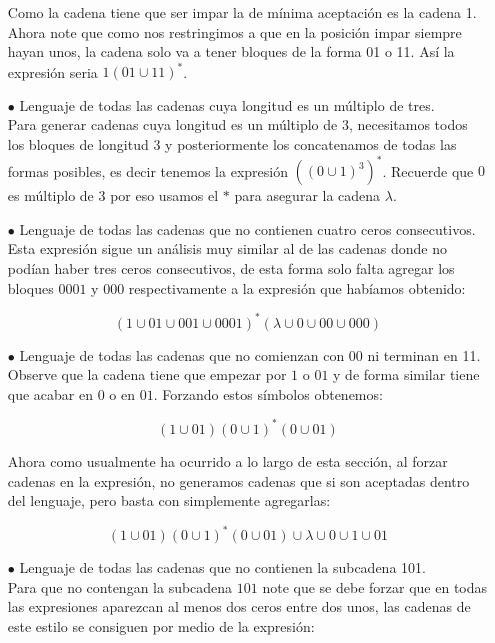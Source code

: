 \begin{itemize}
     Como la cadena tiene que ser impar la de mínima aceptación es la cadena 1. Ahora note que como nos restringimos a que en la posición impar siempre hayan unos, la cadena solo va a tener bloques de la forma 01 o 11. Así la expresión seria $1(01\cup11)^*$.

     \item[$\bullet$] Lenguaje de todas las cadenas cuya longitud es un múltiplo de tres.\\

     Para generar cadenas cuya longitud es un múltiplo de 3, necesitamos todos los bloques de longitud $3$ y posteriormente los concatenamos de todas las formas posibles, es decir tenemos la expresión $\left((0\cup1)^3\right)^*$. Recuerde que $0$ es múltiplo de $3$ por eso usamos el $*$ para asegurar la cadena $\lambda$.

      \item[$\bullet$] Lenguaje de todas las cadenas que no contienen cuatro ceros consecutivos.\\

       Esta expresión sigue un análisis muy similar al de las cadenas donde no podían haber tres ceros consecutivos, de esta forma solo falta agregar los bloques $0001$ y $000$ respectivamente a la expresión que habíamos obtenido:

      $$(1\cup01\cup001\cup0001)^*(\lambda\cup0\cup00\cup000)$$

      \item[$\bullet$] Lenguaje de todas las cadenas que no comienzan con 00 ni terminan en 11.\\

       Observe que la cadena tiene que empezar por $1$ o $01$ y de forma similar tiene que acabar en $0$ o en $01$. Forzando estos símbolos obtenemos:

      $$(1\cup01)(0\cup1)^*(0\cup01)$$

      Ahora como usualmente ha ocurrido a lo largo de esta sección, al forzar cadenas en la expresión, no generamos cadenas que si son aceptadas dentro del lenguaje, pero basta con simplemente agregarlas:

      $$(1\cup01)(0\cup1)^*(0\cup01)\cup\lambda\cup0\cup1\cup01$$

      \item[$\bullet$] Lenguaje de todas las cadenas que no contienen la subcadena 101.\\

       Para que no contengan la subcadena $101$ note que se debe forzar que en todas las expresiones aparezcan al menos dos ceros entre dos unos, las cadenas de este estilo se consiguen por medio de la expresión:


\end{itemize}
